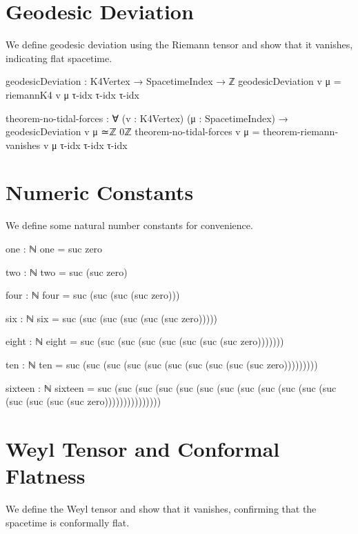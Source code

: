 \documentclass[11pt,a4paper]{book}
\begin{document}
\section{Geodesic Deviation}

We define geodesic deviation using the Riemann tensor and show that it vanishes, indicating flat spacetime.

\begin{code}
geodesicDeviation : K4Vertex → SpacetimeIndex → ℤ
geodesicDeviation v μ = 
  riemannK4 v μ τ-idx τ-idx τ-idx

theorem-no-tidal-forces : ∀ (v : K4Vertex) (μ : SpacetimeIndex) →
  geodesicDeviation v μ ≃ℤ 0ℤ
theorem-no-tidal-forces v μ = theorem-riemann-vanishes v μ τ-idx τ-idx τ-idx
\end{code}

\section{Numeric Constants}

We define some natural number constants for convenience.

\begin{code}
one : ℕ
one = suc zero

two : ℕ
two = suc (suc zero)

four : ℕ
four = suc (suc (suc (suc zero)))

six : ℕ
six = suc (suc (suc (suc (suc (suc zero)))))

eight : ℕ
eight = suc (suc (suc (suc (suc (suc (suc (suc zero)))))))

ten : ℕ
ten = suc (suc (suc (suc (suc (suc (suc (suc (suc (suc zero)))))))))

sixteen : ℕ
sixteen = suc (suc (suc (suc (suc (suc (suc (suc (suc (suc (suc (suc (suc (suc (suc (suc zero)))))))))))))))
\end{code}

\section{Weyl Tensor and Conformal Flatness}

We define the Weyl tensor and show that it vanishes, confirming that the spacetime is conformally flat.
\end{document}
